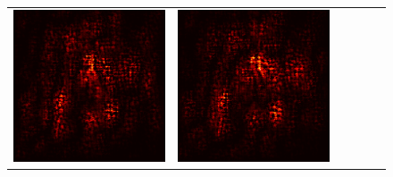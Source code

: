 \documentclass[preprint,12pt]{elsarticle}
\begin{document}
\begin{figure}[p]
\begin{tabular}{cccccc}
  \includegraphics[scale=\scale]{../visualizations/examples/imagenette/cnn/positive_saliency_map/5.png} & 
  \includegraphics[scale=\scale]{../visualizations/examples/imagenette/cnn/negative_saliency_map/5.png} & 

\end{tabular}
\end{figure}
\end{document}
